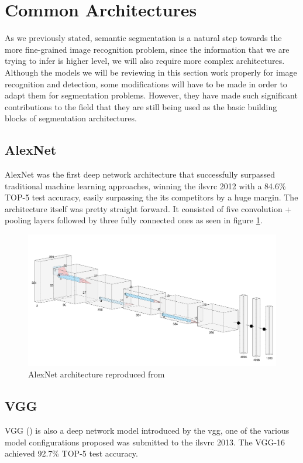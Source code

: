 \section{Common Architectures}
\label{sec:architectures}
As we previously stated, semantic segmentation is a natural step towards the more fine-grained image recognition problem, since the information that we are trying to infer is higher level, we will also require more complex architectures. Although the models we will be reviewing in this section work properly for image recognition and detection, some modifications will have to be made in order to adapt them for segmentation problems. However, they have made such significant contributions to the field that they are still being used as the basic building blocks of segmentation architectures.

\subsection{AlexNet}
AlexNet was the first deep network architecture that successfully surpassed traditional machine learning approaches, winning the \gls{ilsvrc} 2012 with a 84.6\% TOP-5 test accuracy, easily surpassing the its competitors by a huge margin. The architecture itself was pretty straight forward. It consisted of five convolution + pooling layers followed by three fully connected ones as seen in figure \ref{alexnet}.

\begin{figure}[h]
	\includegraphics[scale=0.3]{archivos/alexnet.png}
	\centering
	\caption{AlexNet architecture reproduced from \cite{AlexNet}}
	\label{alexnet}
\end{figure}

\subsection{VGG}
VGG (\cite{DBLP:journals/corr/SimonyanZ14a}) is also a deep network model introduced by the \gls{vgg}, one of the various model configurations proposed was submitted to the \gls{ilsvrc} 2013. The VGG-16 achieved 92.7\% TOP-5 test accuracy.

